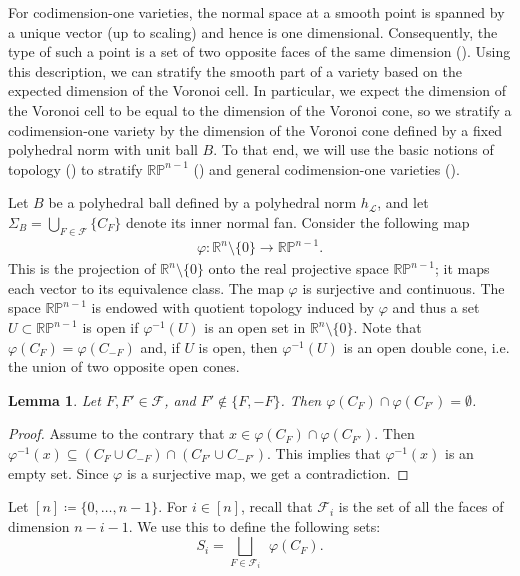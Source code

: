 \documentclass{article}
\numberwithin{theorem}{section}
\newtheorem{lemma}[theorem]{Lemma}
\theoremstyle{definition}
\theoremstyle{example_contd}
\newcommand{\F}{\mathcal{F}}
\newcommand{\RR}{\mathbb{R}}
\newcommand{\PP}{{\mathbb{P}}}
\newcommand{\Rp}{{\mathbb{RP}}}
\begin{document}
For codimension-one varieties, the normal space at a smooth point is spanned by a 
unique vector (up to scaling) and hence is one dimensional. Consequently, the type
of such a point is a set of two opposite faces of the same dimension (). 
Using this description, we can stratify the smooth part of a variety based on the expected dimension of the Voronoi cell. In particular, we expect the dimension of the Voronoi cell to be equal to the dimension of the Voronoi cone, so
we stratify a codimension-one variety by the dimension of the Voronoi cone defined by a fixed polyhedral norm with unit ball $B$. 
To that end, we will use the basic notions of topology ()
to stratify $\RR\PP^{n-1}$ () and general 
codimension-one varieties ().

Let $B$ be a polyhedral ball defined by a polyhedral norm $h_{\mathcal{L}}$, and let $\Sigma_B=\bigcup_{F\in \F}\{C_F\}$ denote its inner normal fan. 
Consider the following map
\begin{align}\label{eq:sphereproj}
\varphi:\RR^n\setminus \{0\} \to \RR\PP^{n-1}.
\end{align}
This is the projection of $\RR^n\setminus \{0\}$ onto the real projective space $\RR\PP^{n-1}$; it maps each vector to its equivalence class. The map $\varphi$ is surjective and continuous. The space  $\RR\PP^{n-1}$ is endowed with quotient topology induced by $\varphi$ and thus a set $U \subset \Rp^{n-1}$ is open if $\varphi^{-1}(U)$ is an open set in $\RR^{n}\setminus\{0\}.$ Note that $\varphi(C_F)=\varphi(C_{-F})$ and, if $U$ is open, then $\varphi^{-1}(U)$ is an open double cone, i.e. the union of two opposite open cones. 

\begin{lemma}\label{lem:disjointimage}
	Let $F,F'\in \F$, and $ F'\notin \{F,-F\}$. Then $\varphi({C_F})\cap \varphi({C_{F'}}) = \emptyset$.
\end{lemma}
\begin{proof}
	Assume to the contrary that $x\in \varphi({C_F})\cap \varphi({C_{F'}})$. Then $\varphi^{-1}(x)\subseteq (C_F\cup C_{-F})\cap (C_{F'}\cup C_{-F'})$. This implies that $\varphi^{-1}(x)$ is an empty set. Since $\varphi$ is a surjective map, we get a contradiction.
\end{proof}

Let $[n]\coloneqq \{0,\ldots ,n-1\}$. For $i\in [n]$, recall that $\F_i$ is the set of all the faces of dimension $n-i-1$. We use this to define the following sets:
\begin{equation*}
	S_i=\bigsqcup_{F\in \F_i} ~~\varphi({C_F}).
\end{equation*}
\end{document}
